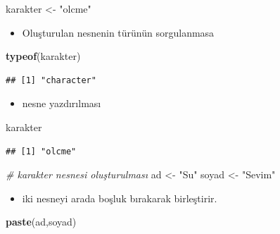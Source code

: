 \documentclass[
  oneside]{book}
\newenvironment{Shaded}{\begin{snugshade}}{\end{snugshade}}
\newcommand{\CommentTok}[1]{\textcolor[rgb]{0.56,0.35,0.01}{\textit{#1}}}
\newcommand{\FunctionTok}[1]{\textcolor[rgb]{0.13,0.29,0.53}{\textbf{#1}}}
\newcommand{\NormalTok}[1]{#1}
\newcommand{\OtherTok}[1]{\textcolor[rgb]{0.56,0.35,0.01}{#1}}
\newcommand{\StringTok}[1]{\textcolor[rgb]{0.31,0.60,0.02}{#1}}
\providecommand{\tightlist}{%
  \setlength{\itemsep}{0pt}\setlength{\parskip}{0pt}}
\begin{document}
\begin{Shaded}
\begin{Highlighting}[]
\NormalTok{karakter }\OtherTok{\textless{}{-}} \StringTok{"olcme"}
\end{Highlighting}
\end{Shaded}

\begin{itemize}
\tightlist
\item
  Oluşturulan nesnenin türünün sorgulanmasa
\end{itemize}

\begin{Shaded}
\begin{Highlighting}[]
\FunctionTok{typeof}\NormalTok{(karakter)}
\end{Highlighting}
\end{Shaded}

\begin{verbatim}
## [1] "character"
\end{verbatim}

\begin{itemize}
\tightlist
\item
  nesne yazdırılması
\end{itemize}

\begin{Shaded}
\begin{Highlighting}[]
\NormalTok{karakter}
\end{Highlighting}
\end{Shaded}

\begin{verbatim}
## [1] "olcme"
\end{verbatim}

\begin{Shaded}
\begin{Highlighting}[]
\CommentTok{\# karakter nesnesi oluşturulması}
\NormalTok{ad }\OtherTok{\textless{}{-}} \StringTok{"Su"}
\NormalTok{soyad }\OtherTok{\textless{}{-}} \StringTok{"Sevim"}
\end{Highlighting}
\end{Shaded}

\begin{itemize}
\tightlist
\item
  iki nesneyi arada boşluk bırakarak birleştirir.
\end{itemize}

\begin{Shaded}
\begin{Highlighting}[]
\FunctionTok{paste}\NormalTok{(ad,soyad)}
\end{Highlighting}
\end{Shaded}
\end{document}
